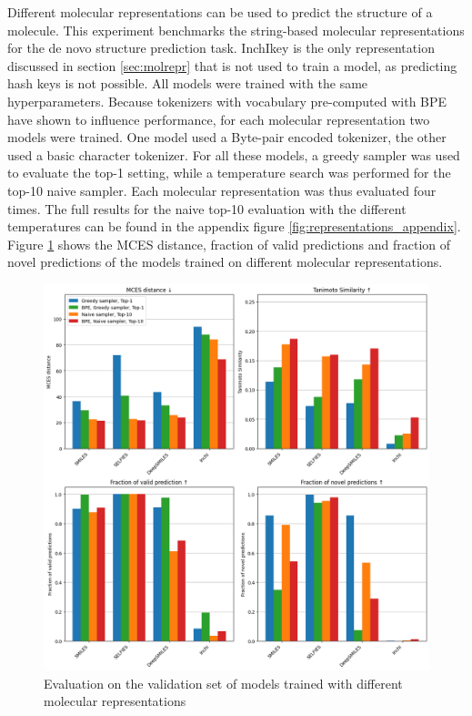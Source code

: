 Different molecular representations can be used to predict the structure of a molecule.
This experiment benchmarks the string-based molecular representations for the de novo structure prediction task.
InchIkey is the only representation discussed in section \ref{sec:molrepr} that is not used to train a model, as predicting hash keys is not possible.
All models were trained with the same hyperparameters.
Because tokenizers with vocabulary pre-computed with \ac{BPE} have shown to influence performance, for each molecular representation two models were trained.
One model used a Byte-pair encoded tokenizer, the other used a basic character tokenizer.
For all these models, a greedy sampler was used to evaluate the top-1 setting, while a temperature search was performed for the top-10 naive sampler.
Each molecular representation was thus evaluated four times.
The full results for the naive top-10 evaluation with the different temperatures can be found in the appendix figure \ref{fig:representations_appendix}.
Figure \ref{fig:representations} shows the MCES distance, fraction of valid predictions and fraction of novel predictions of the models trained on different molecular representations.

\begin{figure}[h]
    \centering
    \includegraphics[width=1.0\textwidth]{figures/results/representations_with_tanimoto.png}
    \caption{Evaluation on the validation set of models trained with different molecular representations}
    \label{fig:representations}
\end{figure}

